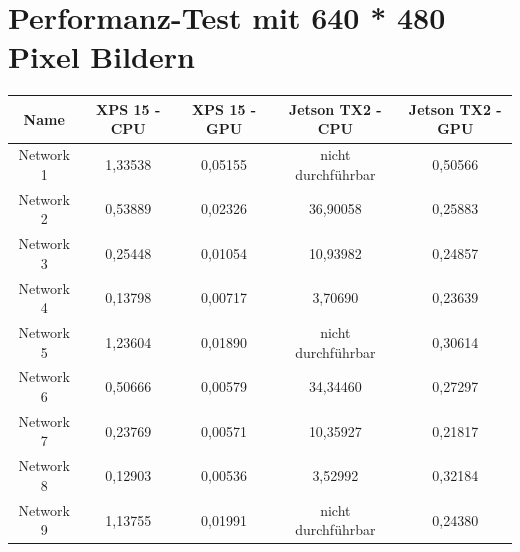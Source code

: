 \section{Performanz-Test mit 640 * 480 Pixel Bildern}
\begin{table}[H]
    \centering
    \begin{tabular}{ |c|c|c|c|c| }
        \hline
        \textbf{Name} & \textbf{XPS 15 - CPU} & \textbf{XPS 15 - GPU} & \textbf{Jetson TX2 - CPU} & \textbf{Jetson TX2 - GPU}   \\ \hline
        Network  1 & 1,33538                                & 0,05155                                & \textcolor{danger}{nicht durchführbar} & 0,50566                                \\ \hline
        Network  2 & 0,53889                                & 0,02326                                & 36,90058                               & 0,25883                                \\ \hline
        Network  3 & 0,25448                                & 0,01054                                & 10,93982                               & 0,24857                                \\ \hline
        Network  4 & 0,13798                                & 0,00717                                & 3,70690                                & 0,23639                                \\ \hline
        Network  5 & 1,23604                                & 0,01890                                & \textcolor{danger}{nicht durchführbar} & 0,30614                                \\ \hline
        Network  6 & 0,50666                                & 0,00579                                & 34,34460                               & 0,27297                                \\ \hline
        Network  7 & 0,23769                                & 0,00571                                & 10,35927                               & 0,21817                                \\ \hline
        Network  8 & 0,12903                                & 0,00536                                & 3,52992                                & 0,32184                                \\ \hline
        Network  9 & 1,13755                                & 0,01991                                & \textcolor{danger}{nicht durchführbar} & 0,24380                                \\ \hline

\end{tabular}
\end{table}
